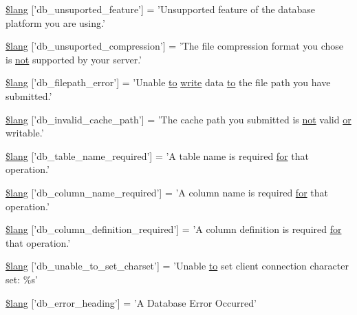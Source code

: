 \begin{DoxyCompactItemize}
\item 
\hyperlink{db__lang_8php_a2841b382e3764873e7e740523106d851}{\$lang} \mbox{[}'db\-\_\-unsuported\-\_\-feature'\mbox{]} = 'Unsupported feature of the database platform you are using.'
\item 
\hyperlink{db__lang_8php_a89603fd8f05ad5569670542ebc15105b}{\$lang} \mbox{[}'db\-\_\-unsuported\-\_\-compression'\mbox{]} = 'The file compression format you chose is \hyperlink{mathquill_8js_ac1e1ab538c27d68cc2cbafea74e7412c}{not} supported by your server.'
\item 
\hyperlink{db__lang_8php_a0519c50a806cec99f29b499aec2582e5}{\$lang} \mbox{[}'db\-\_\-filepath\-\_\-error'\mbox{]} = 'Unable \hyperlink{mathquill_8js_ae3622f38202b3532cd6eae25726945f8}{to} \hyperlink{mathquill_8js_ab3ea9a93d48a6bef28498b6f47c19782}{write} data \hyperlink{mathquill_8js_ae3622f38202b3532cd6eae25726945f8}{to} the file path you have submitted.'
\item 
\hyperlink{db__lang_8php_a67157df2896b342e247ab744adf2b9e5}{\$lang} \mbox{[}'db\-\_\-invalid\-\_\-cache\-\_\-path'\mbox{]} = 'The cache path you submitted is \hyperlink{mathquill_8js_ac1e1ab538c27d68cc2cbafea74e7412c}{not} valid \hyperlink{mathquill_8js_a6fdf1c439b25d95597e99492b728acaa}{or} writable.'
\item 
\hyperlink{db__lang_8php_a2899cf8f7246d7fa97660ea52856ade5}{\$lang} \mbox{[}'db\-\_\-table\-\_\-name\-\_\-required'\mbox{]} = 'A table name is required \hyperlink{mathquill_8js_a6051bae356f28cb834303745ad2f4d86}{for} that operation.'
\item 
\hyperlink{db__lang_8php_ac87ab86a1f105d87327480b6d0659b13}{\$lang} \mbox{[}'db\-\_\-column\-\_\-name\-\_\-required'\mbox{]} = 'A column name is required \hyperlink{mathquill_8js_a6051bae356f28cb834303745ad2f4d86}{for} that operation.'
\item 
\hyperlink{db__lang_8php_ad0ba270704ec81f8f89e486a18660354}{\$lang} \mbox{[}'db\-\_\-column\-\_\-definition\-\_\-required'\mbox{]} = 'A column definition is required \hyperlink{mathquill_8js_a6051bae356f28cb834303745ad2f4d86}{for} that operation.'
\item 
\hyperlink{db__lang_8php_ab22396948e25460833329cb8786ad831}{\$lang} \mbox{[}'db\-\_\-unable\-\_\-to\-\_\-set\-\_\-charset'\mbox{]} = 'Unable \hyperlink{mathquill_8js_ae3622f38202b3532cd6eae25726945f8}{to} set client connection character set\-: \%s'
\item 
\hyperlink{db__lang_8php_a4be34cea2490b0d41689b65e52286658}{\$lang} \mbox{[}'db\-\_\-error\-\_\-heading'\mbox{]} = 'A Database Error Occurred'
\end{DoxyCompactItemize}


